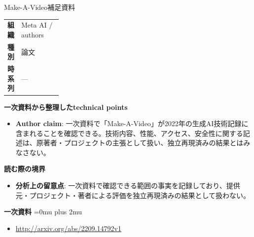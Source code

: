 \begin{technicalnote}{Make-A-Video}{補足資料}
\begingroup
\begin{tabularx}{\linewidth}{@{}>{\bfseries}p{0.22\linewidth}X@{}}
組織 & Meta AI / authors \\
種別 & 論文 \\
時系列 & — \\
\end{tabularx}
\smallskip
{\bfseries 一次資料から整理したtechnical points}
\begin{itemize}[leftmargin=1.5em,itemsep=0.35em]
\item \textbf{Author claim}: 一次資料で「Make-A-Video」が2022年の生成AI技術記録に含まれることを確認できる。技術内容、性能、アクセス、安全性に関する記述は、原著者・プロジェクトの主張として扱い、独立再現済みの結果とはみなさない。
\end{itemize}
\begin{minipage}{\linewidth}
{\bfseries 読む際の境界}
\begin{itemize}[leftmargin=1.5em,itemsep=0.35em]
\item \textbf{分析上の留意点}: 一次資料で確認できる範囲の事実を記録しており、提供元・プロジェクト・著者による評価を独立再現済みの結果として扱わない。
\end{itemize}
\begin{samepage}
{\bfseries 一次資料}
\begingroup\sloppy
\Urlmuskip=0mu plus 2mu\relax
\begin{itemize}[leftmargin=1.5em,itemsep=0.25em]
\item {\scriptsize\url{http://arxiv.org/abs/2209.14792v1}}
\end{itemize}
\endgroup
\end{samepage}
\end{minipage}
\endgroup
\end{technicalnote}
\medskip

